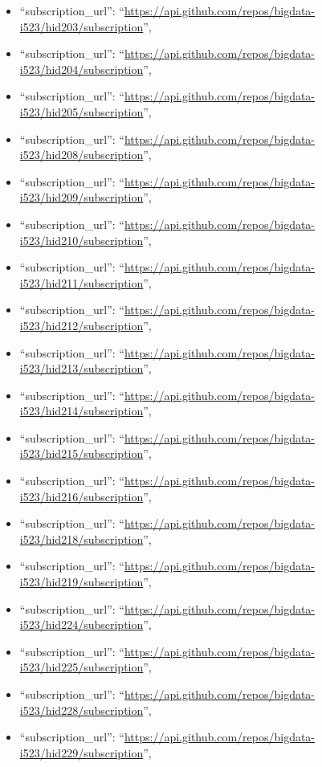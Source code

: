 \begin{itemize}
\item
  ``subscription\_url'':
  ``\url{https://api.github.com/repos/bigdata-i523/hid203/subscription}'',
\item
  ``subscription\_url'':
  ``\url{https://api.github.com/repos/bigdata-i523/hid204/subscription}'',
\item
  ``subscription\_url'':
  ``\url{https://api.github.com/repos/bigdata-i523/hid205/subscription}'',
\item
  ``subscription\_url'':
  ``\url{https://api.github.com/repos/bigdata-i523/hid208/subscription}'',
\item
  ``subscription\_url'':
  ``\url{https://api.github.com/repos/bigdata-i523/hid209/subscription}'',
\item
  ``subscription\_url'':
  ``\url{https://api.github.com/repos/bigdata-i523/hid210/subscription}'',
\item
  ``subscription\_url'':
  ``\url{https://api.github.com/repos/bigdata-i523/hid211/subscription}'',
\item
  ``subscription\_url'':
  ``\url{https://api.github.com/repos/bigdata-i523/hid212/subscription}'',
\item
  ``subscription\_url'':
  ``\url{https://api.github.com/repos/bigdata-i523/hid213/subscription}'',
\item
  ``subscription\_url'':
  ``\url{https://api.github.com/repos/bigdata-i523/hid214/subscription}'',
\item
  ``subscription\_url'':
  ``\url{https://api.github.com/repos/bigdata-i523/hid215/subscription}'',
\item
  ``subscription\_url'':
  ``\url{https://api.github.com/repos/bigdata-i523/hid216/subscription}'',
\item
  ``subscription\_url'':
  ``\url{https://api.github.com/repos/bigdata-i523/hid218/subscription}'',
\item
  ``subscription\_url'':
  ``\url{https://api.github.com/repos/bigdata-i523/hid219/subscription}'',
\item
  ``subscription\_url'':
  ``\url{https://api.github.com/repos/bigdata-i523/hid224/subscription}'',
\item
  ``subscription\_url'':
  ``\url{https://api.github.com/repos/bigdata-i523/hid225/subscription}'',
\item
  ``subscription\_url'':
  ``\url{https://api.github.com/repos/bigdata-i523/hid228/subscription}'',
\item
  ``subscription\_url'':
  ``\url{https://api.github.com/repos/bigdata-i523/hid229/subscription}'',

\end{itemize}
